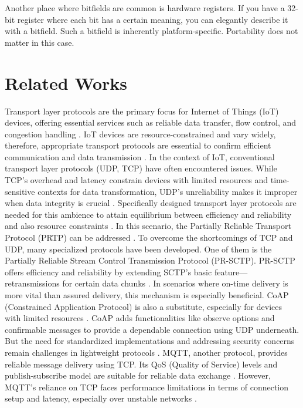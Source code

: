 \documentclass[lettersize,journal]{IEEEtran}
\begin{document}
Another place where bitfields are common is hardware registers. If you have a 32-bit register where each bit has a certain meaning, you can elegantly describe it with a bitfield. Such a bitfield is inherently platform-specific. Portability does not matter in this case.

\section{Related Works}
Transport layer protocols are the primary focus for Internet of Things (IoT) devices, offering essential services such as reliable data transfer, flow control, and congestion handling \cite{Shang2016Challenges}. IoT devices are resource-constrained and vary widely, therefore, appropriate transport protocols are essential to confirm efficient communication and data transmission \cite{Liri2018Robustness}. In the context of IoT, conventional transport layer protocols (UDP, TCP) have often encountered issues. While TCP’s overhead and latency constrain devices with limited resources and time-sensitive contexts for data transformation, UDP’s unreliability makes it improper when data integrity is crucial \cite{Shang2016Challenges}. Specifically designed transport layer protocols are needed for this ambience to attain equilibrium between efficiency and reliability and also resource constraints \cite{Grinnemo2002PRTP}. In this scenario, the Partially Reliable Transport Protocol (PRTP) can be addressed \cite{Grinnemo2002PRTP}.
To overcome the shortcomings of TCP and UDP, many specialized protocols have been developed. One of them is the Partially Reliable Stream Control Transmission Protocol (PR-SCTP). PR-SCTP offers efficiency and reliability by extending SCTP’s basic feature—retransmissions for certain data chunks \cite{Rajiullah2012PRSCTP}. In scenarios where on-time delivery is more vital than assured delivery, this mechanism is especially beneficial. CoAP (Constrained Application Protocol) is also a substitute, especially for devices with limited resources \cite{Shelby2014CoAP}. CoAP adds functionalities like observe options and confirmable messages to provide a dependable connection using UDP underneath. But the need for standardized implementations and addressing security concerns remain challenges in lightweight protocols \cite{Liri2018Robustness}.
MQTT, another protocol, provides reliable message delivery using TCP. Its QoS (Quality of Service) levels and publish-subscribe model are suitable for reliable data exchange \cite{OASIS2013MQTT}. However, MQTT’s reliance on TCP faces performance limitations in terms of connection setup and latency, especially over unstable networks \cite{Fernandez2021QUIC}.
\end{document}
